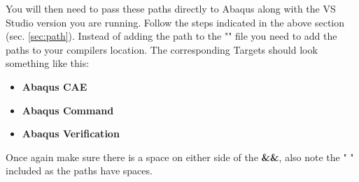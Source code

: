 \documentclass[10pt,a4paper,oneside]{article}
\begin{document}
You will then need to pass these paths directly to Abaqus along with the VS Studio version you are running. Follow the steps indicated in the above section (sec. \ref{sec:path}). Instead of adding the path to the "" file  you need to add the paths to your compilers location. The corresponding Targets should look something like this:

\begin{itemize}
\item \textbf{Abaqus CAE }\\

\item \textbf{Abaqus Command }\\
\item \textbf{Abaqus Verification }\\
 \newline 
{}
\end{itemize}

Once again make sure there is a space on either side of the \textbf{\&\&}, also note the " " included as the paths have spaces. 
\end{document}
